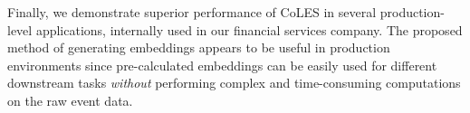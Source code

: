 \documentclass[sigconf]{acmart}
\begin{document}
Finally, we demonstrate superior performance of CoLES in several production-level
applications, internally used in our financial services company.
% 
The proposed method of generating embeddings appears to be useful in production environments
since pre-calculated embeddings can be easily used for different downstream tasks \emph{without}
performing complex and time-consuming computations on the raw event data.




\end{document}
